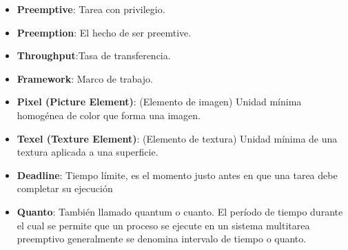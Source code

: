 \begin{itemize}
\item \textbf{Preemptive}: Tarea con privilegio.
\item \textbf{Preemption}: El hecho de ser preemtive.
\item \textbf{Throughput}:Tasa de transferencia.
\item \textbf{Framework}: Marco de trabajo.
\item \textbf{Pixel (Picture Element)}: (Elemento de imagen) Unidad mínima homogénea de color que forma una imagen.
\item \textbf{Texel (Texture Element)}: (Elemento de textura)  Unidad mínima de una textura aplicada a una superficie.

\item \textbf{Deadline}: Tiempo límite, es el momento justo antes en que una tarea debe completar su ejecución

\item \textbf{Quanto}: También llamado quantum o cuanto. El período de tiempo durante el cual se permite que un proceso se ejecute en un sistema multitarea preemptivo generalmente se denomina intervalo de tiempo o quanto.
\end{itemize}  

